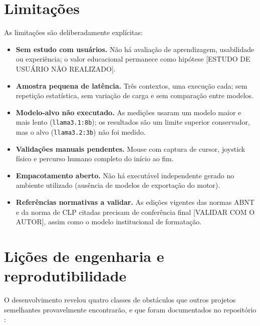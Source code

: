 \section{Limitações}
\label{sec:limitacoes}

As limitações são deliberadamente explícitas:

\begin{itemize}
  \item \textbf{Sem estudo com usuários.} Não há avaliação de aprendizagem,
  usabilidade ou experiência; o valor educacional permanece como hipótese
  [ESTUDO DE USUÁRIO NÃO REALIZADO].
  \item \textbf{Amostra pequena de latência.} Três contextos, uma execução
  cada; sem repetição estatística, sem variação de carga e sem comparação
  entre modelos.
  \item \textbf{Modelo-alvo não executado.} As medições usaram um modelo maior
  e mais lento (\texttt{llama3.1:8b}); os resultados são um limite superior
  conservador, mas o alvo (\texttt{llama3.2:3b}) não foi medido.
  \item \textbf{Validações manuais pendentes.} Mouse com captura de cursor,
  joystick físico e percurso humano completo do início ao fim.
  \item \textbf{Empacotamento aberto.} Não há executável independente gerado
  no ambiente utilizado (ausência de modelos de exportação do motor).
  \item \textbf{Referências normativas a validar.} As edições vigentes das
  normas ABNT e da norma de CLP citadas precisam de conferência final
  [VALIDAR COM O AUTOR], assim como o modelo institucional de formatação.
\end{itemize}

\section{Lições de engenharia e reprodutibilidade}
\label{sec:licoes}

O desenvolvimento revelou quatro classes de obstáculos que outros projetos
semelhantes provavelmente encontrarão, e que foram documentados no repositório
\cite{lab404repo}:

